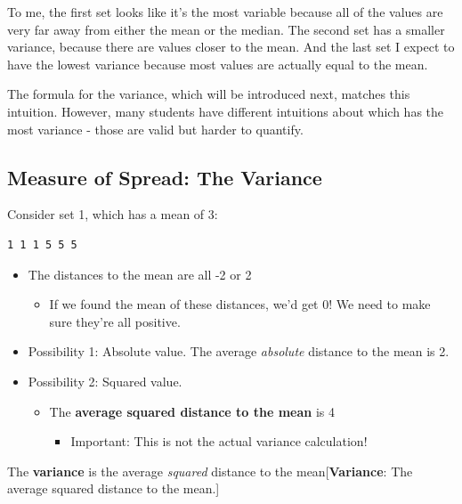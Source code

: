 \documentclass[
  letterpaper,
  DIV=11,
  numbers=noendperiod,
  oneside]{scrreprt}
\providecommand{\tightlist}{%
  \setlength{\itemsep}{0pt}\setlength{\parskip}{0pt}}\usepackage{longtable,booktabs,array}
\begin{document}
To me, the first set looks like it's the most variable because all of
the values are very far away from either the mean or the median. The
second set has a smaller variance, because there are values closer to
the mean. And the last set I expect to have the lowest variance because
most values are actually equal to the mean.

The formula for the variance, which will be introduced next, matches
this intuition. However, many students have different intuitions about
which has the most variance - those are valid but harder to quantify.

\hypertarget{measure-of-spread-the-variance}{%
\subsection{Measure of Spread: The
Variance}\label{measure-of-spread-the-variance}}

Consider set 1, which has a mean of 3:

\begin{verbatim}
1 1 1 5 5 5
\end{verbatim}

\begin{itemize}
\tightlist
\item
  The distances to the mean are all -2 or 2

  \begin{itemize}
  \tightlist
  \item
    If we found the mean of these distances, we'd get 0! We need to make
    sure they're all positive.
  \end{itemize}
\item
  Possibility 1: Absolute value. The average \emph{absolute} distance to
  the mean is 2.
\item
  Possibility 2: Squared value.

  \begin{itemize}
  \tightlist
  \item
    The \textbf{average squared distance to the mean} is 4

    \begin{itemize}
    \tightlist
    \item
      Important: This is not the actual variance calculation!
    \end{itemize}
  \end{itemize}
\end{itemize}

The \textbf{variance} is the average \emph{squared} distance to the
mean{[}\textbf{Variance}: The average squared distance to the mean.{]}
\end{document}
